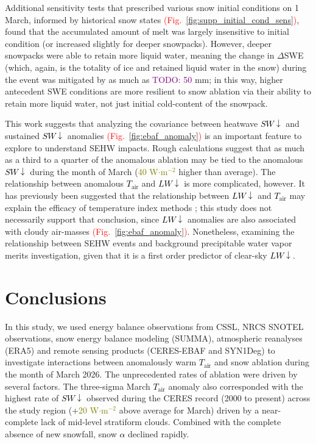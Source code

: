 \documentclass[draft]{agujournal2019}
\newcommand{\fig}[2]{\textcolor{red}{(Fig.~\ref{#1}{#2})}}   %
\newcommand{\todo}[1]{\textcolor{purple}{TODO: #1}}      %
\newcommand{\mynum}[1]{\textcolor{olive}{#1}}
\newcommand{\tair}{\textcolor{black}{$T_{\mathrm{air}}$}\xspace}
\newcommand{\lwdn}{\textcolor{black}{$LW\downarrow$}\xspace}
\newcommand{\swdn}{\textcolor{black}{$SW\downarrow$}\xspace}
\newcommand{\albedo}{\textcolor{black}{$\alpha$}\xspace}
\newcommand{\wmsq}{\textcolor{olive}{W$\cdot$m$^{-2}$}\xspace}
\begin{document}
Additional sensitivity tests that prescribed various snow initial conditions on 1 March, informed by historical snow states \fig{fig:supp_initial_cond_sens}{}, found that the accumulated amount of melt was largely insensitive to initial condition (or increased slightly for deeper snowpacks).
However, deeper snowpacks were able to retain more liquid water, meaning the change in $\Delta$SWE (which, again, is the totality of ice and retained liquid water in the snow) during the event was mitigated by as much as \todo{50} mm; in this way, higher antecedent SWE conditions are more resilient to snow ablation via their ability to retain more liquid water, not just initial cold-content of the snowpack.


This work suggests that analyzing the covariance between heatwave \swdn and sustained \swdn anomalies \fig{fig:ebaf_anomaly}{} is an important feature to explore to understand SEHW impacts.
Rough calculations suggest that as much as a third to a quarter of the anomalous ablation may be tied to the anomalous \swdn during the month of March (\mynum{40} \wmsq higher than average).
The relationship between anomalous \tair and \lwdn is more complicated, however.
It has previously been suggested that the relationship between \lwdn and \tair may explain the efficacy of temperature index methods \cite{Ohmura2001-ll}; this study does not necessarily support that conclusion, since \lwdn anomalies are also associated with cloudy air-masses \fig{fig:ebaf_anomaly}{}.
Nonetheless, examining the relationship between SEHW events and background precipitable water vapor merits investigation, given that it is a first order predictor of clear-sky \lwdn \cite{Brutsaert1975-jl}. 



\section{Conclusions}
In this study, we used energy balance observations from CSSL, NRCS SNOTEL observations, snow energy balance modeling (SUMMA), atmospheric reanalyses (ERA5) and remote sensing products (CERES-EBAF and SYN1Deg) to investigate interactions between anomalously warm \tair and snow ablation during the month of March 2026.
The unprecedented rates of ablation were driven by several factors.
The three-sigma March \tair anomaly also corresponded with the highest rate of \swdn observed during the CERES record (2000 to present) across the study region (+\mynum{20} \wmsq above average for March) driven by a near-complete lack of mid-level stratiform clouds.
Combined with the complete absence of new snowfall, snow \albedo declined rapidly.
\end{document}
